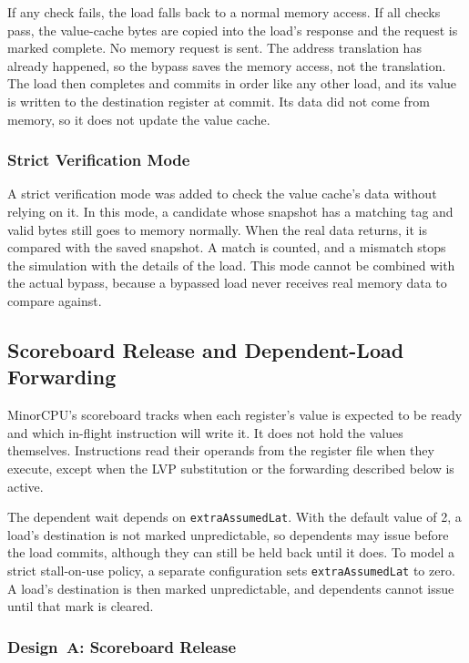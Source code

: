 If any check fails, the load falls back to a normal memory access. If all checks pass, the value-cache bytes
are copied into the load's response and the request is marked
complete. No memory request is sent. The address translation has
already happened, so the bypass saves the memory access, not the
translation. The load then completes and commits in order like any
other load, and its value is written to the destination register at
commit. Its data did not come from memory, so it does not update the
value cache.

\subsubsection{Strict Verification Mode}

A strict verification mode was added to check the value cache's data
without relying on it. In this mode, a candidate whose snapshot has a
matching tag and valid bytes still goes to memory normally. When the
real data returns, it is compared with the saved snapshot. A match is
counted, and a mismatch stops the simulation with the details of the
load. This mode cannot be combined with the actual bypass, because a
bypassed load never receives real memory data to compare against.

\subsection{Scoreboard Release and Dependent-Load Forwarding}
\label{sec:impl-sb}

MinorCPU's scoreboard tracks when each register's value is expected
to be ready and which in-flight instruction will write it. It does
not hold the values themselves. Instructions read their operands from
the register file when they execute, except when the LVP substitution
or the forwarding described below is active.

The dependent wait depends on \texttt{extraAssumedLat}. With
the default value of 2, a load's destination is not marked
unpredictable, so dependents may issue before the load commits,
although they can still be held back until it does. To model a strict
stall-on-use policy, a separate configuration sets
\texttt{extraAssumedLat} to zero. A load's destination is then marked
unpredictable, and dependents cannot issue until that mark is cleared.

\subsubsection{Design~A: Scoreboard Release}

